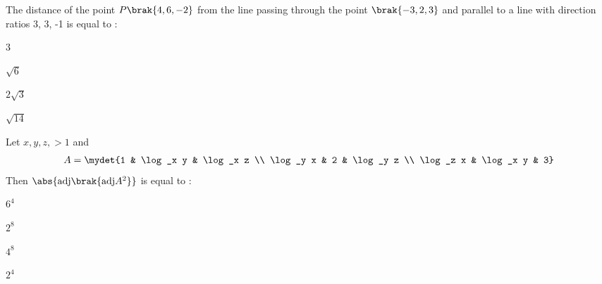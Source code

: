    \item The distance of the point $P\brak{4, 6, -2}$ from the line passing through
        the point $\brak{-3, 2, 3}$ and parallel to a line with direction ratios 3, 3, -1 is
        equal to :
        \hfill{}
        \begin{enumerate}
                \begin{multicols}{2}
                \item 3\columnbreak
                \item $\sqrt{6}$
                \end{multicols}
                \begin{multicols}{2}
                \item $2\sqrt{3}$ \columnbreak
                \item $\sqrt{14}$
                \end{multicols}
        \end{enumerate}
        \begin{figure}[ht]
            \centering
        \end{figure}
    \item  Let $x, y, z, > 1$ and   
        \begin{align}
            A = \mydet{1 & \log_x y & \log_x z \\ \log_y x & 2 & \log_y z \\
            \log_z x & \log_x y & 3}
        \end{align} 
        Then $\abs{\textnormal{adj}\brak{\textnormal{adj}A^2}}$ is equal to :
        \hfill{}
        \begin{enumerate}
                \begin{multicols}{4}
                \item $6^4$ \columnbreak
                \item $2^8$ \columnbreak
                \item $4^8$ \columnbreak
                \item $2^4$
                \end{multicols}
        \end{enumerate}

